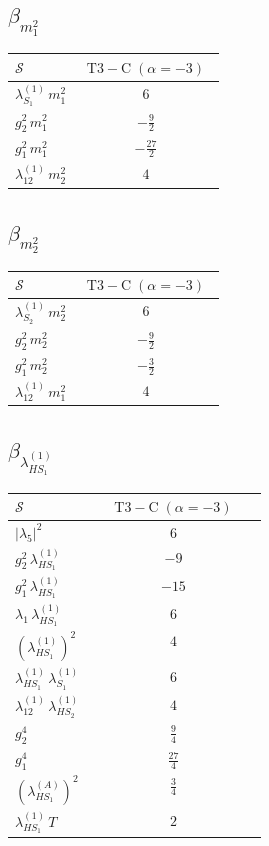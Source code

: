 \documentclass[9pt]{article}
\begin{document}
\subsection*{$ \beta_{m_1^{2}} $}
\begin{longtable}{@{}p{0.31\linewidth}c@{}}
\toprule
$\mathcal{S}$ & $ \mathrm{T3-C}\;(\alpha=-3) $ \\
\midrule
$ \lambda_{S_1}^{(1)}\,m_1^{2} $ & $ 6 $ \\
$ g_2^2\,m_1^{2} $ & $ - \frac{9}{2} $ \\
$ g_1^2\,m_1^{2} $ & $ - \frac{27}{2} $ \\
$ \lambda_{12}^{(1)}\,m_2^{2} $ & $ 4 $ \\
\bottomrule
\end{longtable}
\subsection*{$ \beta_{m_2^{2}} $}
\begin{longtable}{@{}p{0.31\linewidth}c@{}}
\toprule
$\mathcal{S}$ & $ \mathrm{T3-C}\;(\alpha=-3) $ \\
\midrule
$ \lambda_{S_2}^{(1)}\,m_2^{2} $ & $ 6 $ \\
$ g_2^2\,m_2^{2} $ & $ - \frac{9}{2} $ \\
$ g_1^2\,m_2^{2} $ & $ - \frac{3}{2} $ \\
$ \lambda_{12}^{(1)}\,m_1^{2} $ & $ 4 $ \\
\bottomrule
\end{longtable}
\subsection*{$ \beta_{\lambda_{HS_1}^{(1)}} $}
\begin{longtable}{@{}p{0.31\linewidth}c@{}}
\toprule
$\mathcal{S}$ & $ \mathrm{T3-C}\;(\alpha=-3) $ \\
\midrule
$ |\lambda_5|^2 $ & $ 6 $ \\
$ g_2^2\,\lambda_{HS_1}^{(1)} $ & $ -9 $ \\
$ g_1^2\,\lambda_{HS_1}^{(1)} $ & $ -15 $ \\
$ \lambda_1\,\lambda_{HS_1}^{(1)} $ & $ 6 $ \\
$ \left(\lambda_{HS_1}^{(1)}\right)^2 $ & $ 4 $ \\
$ \lambda_{HS_1}^{(1)}\,\lambda_{S_1}^{(1)} $ & $ 6 $ \\
$ \lambda_{12}^{(1)}\,\lambda_{HS_2}^{(1)} $ & $ 4 $ \\
$ g_2^4 $ & $ \frac{9}{4} $ \\
$ g_1^4 $ & $ \frac{27}{4} $ \\
$ \left(\lambda_{HS_1}^{(A)}\right)^2 $ & $ \frac{3}{4} $ \\
$ \lambda_{HS_1}^{(1)}\,T $ & $ 2 $ \\
\bottomrule
\end{longtable}
\end{document}
